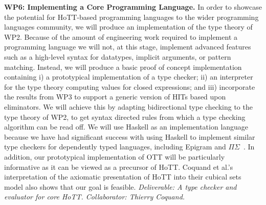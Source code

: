 \documentclass[a4paper,11pt]{article}
\begin{document}
{\bf WP6: Implementing a Core Programming Language.} In order to
showcase the potential for HoTT-based programming languages to the
wider programming languages
community,%
we will produce an implementation of the type theory of WP2.  Because
of the amount of engineering work required to implement a programming
language we will not, at this stage, implement advanced features such
as a high-level syntax for datatypes, implicit arguments, or pattern
matching. Instead, we will produce a basic proof of concept
implementation containing i) a prototypical implementation of a type
checker; ii) an interpreter for the type theory computing values for
closed expressions; and iii) incorporate the results from WP3 to
support a generic version of HITs based upon eliminators. We will
achieve this by adapting bidirectional type checking to the type
theory of WP2, to get syntax directed rules from which a type checking
algorithm can be read off. We will use Haskell as an implementation
language because we have had significant success with using Haskell to
implement similar type checkers for dependently typed languages,
including Epigram and
$\Pi\Sigma$~\cite{alti:checking,easy,alti:pisigma-new}.  In addition,
our prototypical implementation of OTT will be particularly
informative as it can be viewed as a precursor of HoTT.  Coquand et
al.'s interpretation of the axiomatic presentation of HoTT into their
cubical sets model also shows that our goal is feasible. {\em
  Deliverable: A type checker and evaluator for core HoTT.
  Collaborator: Thierry Coquand.  }


\end{document}
